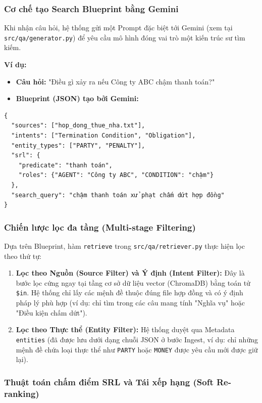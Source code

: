 \subsubsection{Cơ chế tạo Search Blueprint bằng Gemini}

Khi nhận câu hỏi, hệ thống gửi một Prompt đặc biệt tới Gemini (xem tại \texttt{src/qa/generator.py}) để yêu cầu mô hình đóng vai trò một kiến trúc sư tìm kiếm. 

\textbf{Ví dụ:} 
\begin{itemize}
    \item \textbf{Câu hỏi:} "Điều gì xảy ra nếu Công ty ABC chậm thanh toán?"
    \item \textbf{Blueprint (JSON) tạo bởi Gemini:}
\end{itemize}

\begin{verbatim}
{
  "sources": ["hop_dong_thue_nha.txt"],
  "intents": ["Termination Condition", "Obligation"],
  "entity_types": ["PARTY", "PENALTY"],
  "srl": {
    "predicate": "thanh toán",
    "roles": {"AGENT": "Công ty ABC", "CONDITION": "chậm"}
  },
  "search_query": "chậm thanh toán xử phạt chấm dứt hợp đồng"
}
\end{verbatim}

\subsubsection{Chiến lược lọc đa tầng (Multi-stage Filtering)}

Dựa trên Blueprint, hàm \texttt{retrieve} trong \texttt{src/qa/retriever.py} thực hiện lọc theo thứ tự:

\begin{enumerate}
    \item \textbf{Lọc theo Nguồn (Source Filter) và Ý định (Intent Filter):} Đây là bước lọc cứng ngay tại tầng cơ sở dữ liệu vector (ChromaDB) bằng toán tử \texttt{\$in}. Hệ thống chỉ lấy các mệnh đề thuộc đúng file hợp đồng và có ý định pháp lý phù hợp (ví dụ: chỉ tìm trong các câu mang tính "Nghĩa vụ" hoặc "Điều kiện chấm dứt").
    \item \textbf{Lọc theo Thực thể (Entity Filter):} Hệ thống duyệt qua Metadata \texttt{entities} (đã được lưu dưới dạng chuỗi JSON ở bước Ingest, ví dụ: chỉ những mệnh đề chứa loại thực thể như \texttt{PARTY} hoặc \texttt{MONEY} được yêu cầu mới được giữ lại).
\end{enumerate}

\subsubsection{Thuật toán chấm điểm SRL và Tái xếp hạng (Soft Re-ranking)}

